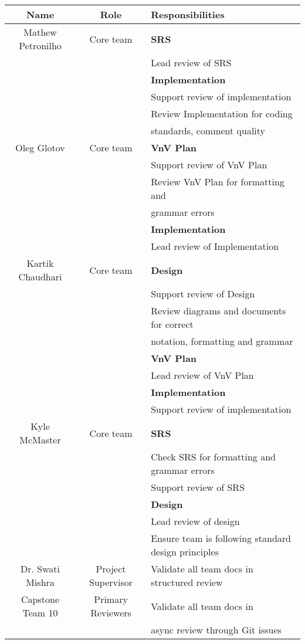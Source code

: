 \documentclass[12pt, titlepage]{article}
\begin{document}
\begin{center}
\begin{tabular}{|c|c|l|}
  \hline
  \textbf{Name} & \textbf{Role} & \textbf{Responsibilities}\\\hline
  Mathew Petronilho & Core team & \textbf{SRS} \\
  & & Lead review of SRS\\
  & & \textbf{Implementation}\\
  & & Support review of implementation\\
  & & Review Implementation for coding \\
  & & standards, comment quality\\
  \hline
  Oleg Glotov & Core team & \textbf{VnV Plan} \\
  & & Support review of VnV Plan\\
  & & Review VnV Plan for formatting and \\
  & & grammar errors\\
  & & \textbf{Implementation}\\
  & & Lead review of Implementation\\
  \hline
  Kartik Chaudhari & Core team & \textbf{Design} \\
  & & Support review of Design\\
  & & Review diagrams and documents for correct \\
  & & notation, formatting and grammar\\
  & & \textbf{VnV Plan}\\
  & & Lead review of VnV Plan\\
  & & \textbf{Implementation}\\
  & & Support review of implementation\\
  \hline
  Kyle McMaster & Core team & \textbf{SRS} \\
  & & Check SRS for formatting and grammar errors\\
  & & Support review of SRS\\
  & & \textbf{Design}\\
  & & Lead review of design\\
  & & Ensure team is following standard design principles\\
  \hline
  Dr. Swati Mishra & Project Supervisor & Validate all team docs in structured review\\\hline
  Capstone Team 10 & Primary Reviewers & Validate all team docs in \\
  & & async review through Git issues\\
  \hline
\end{tabular}
\end{center}
\end{document}
